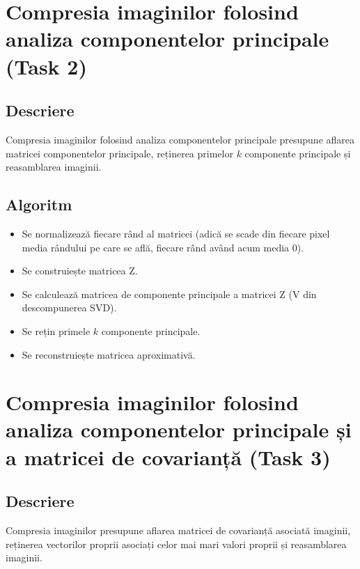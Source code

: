 \documentclass{article}
\begin{document}
\section{Compresia imaginilor folosind analiza componentelor principale (Task 2)}

\subsection{Descriere}
Compresia imaginilor folosind analiza componentelor principale presupune aflarea
matricei componentelor principale, reținerea primelor $k$ componente principale
și reasamblarea imaginii.

\subsection{Algoritm}
\begin{itemize}
      \item Se normalizează fiecare rând al matricei (adică se scade din fiecare
            pixel media rândului pe care se află, fiecare rând având acum media
            0).
      \item Se construiește matricea Z.
      \item Se calculează matricea de componente principale a matricei Z (V din
            descompunerea SVD).
      \item Se rețin primele $k$ componente principale.
      \item Se reconstruiește matricea aproximativă.
\end{itemize}

\section{Compresia imaginilor folosind analiza componentelor principale și a
  matricei de covarianță (Task 3)}

\subsection{Descriere}
Compresia imaginilor presupune aflarea matricei de covarianță asociată imaginii,
reținerea vectorilor proprii asociați celor mai mari valori proprii și
reasamblarea imaginii.
\end{document}

